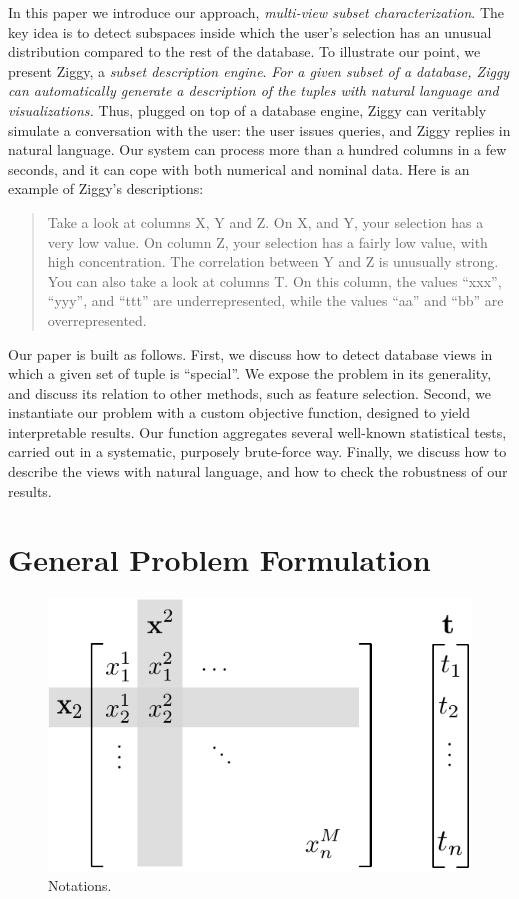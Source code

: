 In this paper we introduce our approach, \emph{multi-view subset
characterization}. The key idea is to detect subspaces inside which the user's
selection has an unusual distribution compared to the rest of the database.  To
illustrate our point, we present Ziggy, a \emph{subset description engine}.
\emph{For a given subset of a database, Ziggy can automatically generate a
description of the tuples with natural language and visualizations.} Thus,
plugged on top of a database engine, Ziggy can veritably simulate a
conversation with the user: the user issues queries, and Ziggy replies in
natural language. Our system can process more than a hundred columns in a few
seconds, and it can cope with both numerical and nominal data. Here is an
example of Ziggy's descriptions:
\begin{quote}
    Take a look at columns X, Y and Z. On X, and Y, your selection has a very
    low value. On column Z, your selection has a fairly low value, with high
    concentration. The correlation between Y and Z is unusually strong.\\
    You can also take a look at columns T. On this column, the
    values ``xxx'', ``yyy'', and ``ttt'' are underrepresented, while the values
    ``aa'' and ``bb'' are overrepresented.
\end{quote}

%
Our paper is built as follows. First, we discuss how to detect database views
in which a given set of tuple is ``special''. We expose the problem in its
generality, and discuss its relation to other methods, such as feature
selection. Second, we instantiate our problem with a custom objective function,
designed to yield interpretable results. Our function aggregates several
well-known statistical tests, carried out in a systematic, purposely
brute-force way.  Finally, we discuss how to describe the views with natural
language, and how to check the robustness of our results.

\section{General Problem Formulation}
\label{sec:problem}
\begin{figure}
  \centering
  \includegraphics[width=0.6\columnwidth]{Figures/Notations}
  \caption{Notations.}
  \label{pic:notations}
\end{figure}

